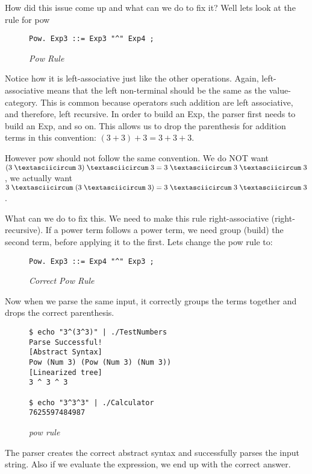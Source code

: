 \documentclass{article}
\begin{document}
\medskip\noindent
How did this issue come up and what can we do to fix it? Well lets look at the rule for pow 
\begin{figure}[H]
    \begin{lstlisting}
Pow. Exp3 ::= Exp3 "^" Exp4 ;
    \end{lstlisting}
    \caption{\textit{Pow Rule}}
\end{figure}
Notice how it is left-associative just like the other operations. Again, left-associative means that the left non-terminal should be the same as the value-category. This is common because operators such addition are left associative, and therefore, left recursive. In order to build an Exp, the parser first needs to build an Exp, and so on\cite{IPL}. This allows us to drop the parenthesis for addition terms in this convention: $(3 + 3) + 3 = 3 + 3 + 3$. 

\medskip\noindent
However pow should not follow the same convention. We do NOT want $(3 \; \textasciicircum \; 3) \;  \textasciicircum \; 3 = 
3 \; \textasciicircum\; 3 \; \textasciicircum\; 3$, we actually want $3 \; \textasciicircum \; (3 \;  \textasciicircum \; 3) = 
3 \; \textasciicircum\; 3 \; \textasciicircum\; 3$.

\medskip\noindent
What can we do to fix this. We need to make this rule right-associative (right-recursive). If a power term follows a power term, we need group (build) the second term, before applying it to the first. Lets change the pow rule to:
\begin{figure}[H]
    \begin{lstlisting}
Pow. Exp3 ::= Exp4 "^" Exp3 ;
    \end{lstlisting}
    \caption{\textit{Correct Pow Rule}}
\end{figure}

Now when we parse the same input, it correctly groups the terms together and drops the correct parenthesis. 
\begin{figure}[H]
    \begin{lstlisting}
$ echo "3^(3^3)" | ./TestNumbers 
Parse Successful!
[Abstract Syntax]
Pow (Num 3) (Pow (Num 3) (Num 3))
[Linearized tree]
3 ^ 3 ^ 3

$ echo "3^3^3" | ./Calculator 
7625597484987
    \end{lstlisting}
    \caption{\textit{pow rule}}
\end{figure}

The parser creates the correct abstract syntax and successfully parses the input string. Also if we evaluate the expression, we end up with the correct answer.
\end{document}
